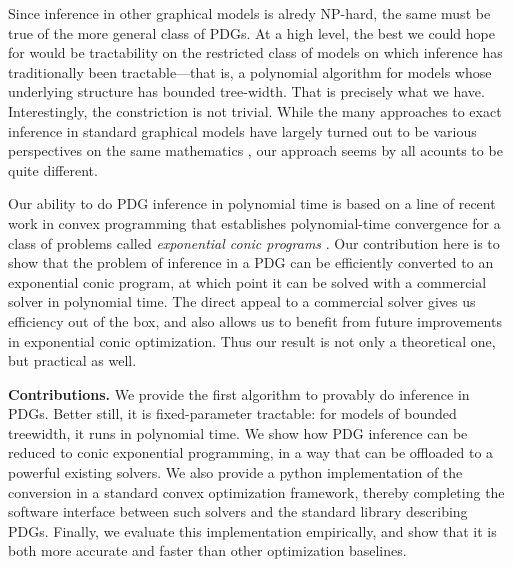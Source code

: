 \documentclass[twoside]{article}
\begin{document}
Since inference in other graphical models is alredy NP-hard, the same must be true of the more general class of PDGs. 
At a high level, the best we could hope for would be tractability on the restricted
class of models on which inference has traditionally been tractable---that is, a polynomial algorithm for models whose underlying structure has bounded tree-width. 
That is precisely what we have. 
Interestingly, the constriction is not trivial. 
%
While the many approaches to exact inference in standard graphical models have largely turned out to be various perspectives on the same mathematics \parencite[\S9-11]{koller2009probabilistic},
our approach seems by all acounts to be quite different.

Our ability to do PDG inference in polynomial time is based on a line of recent work in convex programming that establishes polynomial-time convergence 
\parencite{badenbroek2021algorithm,dahl2022primal}
for a class of problems called \emph{exponential conic programs} 
\parencite{lubin}. 
Our contribution here is to show that the problem of inference in a PDG can be efficiently converted to an exponential conic program, at which point it can be solved with a commercial solver \parencite{mosek} in polynomial time. 
The direct appeal to a commercial solver gives us efficiency out of the box, and also allows us to benefit from future improvements in exponential conic optimization. 
Thus our result is not only a theoretical one, but practical as well.


\textbf{Contributions.} 
We provide the first algorithm to provably do inference in PDGs. 
Better still, it is fixed-parameter tractable: for models of bounded treewidth,
    it runs in polynomial time.
We show how PDG inference can be reduced to conic exponential programming,
    in a way that can be offloaded to a powerful existing solvers.
We also provide a python implementation of the conversion in a standard convex optimization framework, thereby completing the software interface between such solvers and the standard library describing PDGs.
Finally, we evaluate this implementation empirically, and show that it is both more accurate and faster than other optimization baselines.
% 
\end{document}
